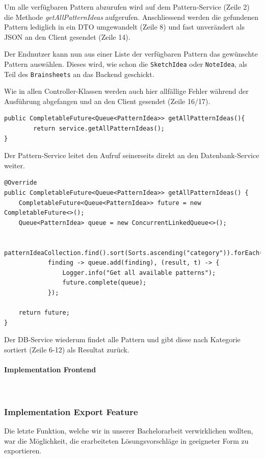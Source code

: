 Um alle verfügbaren Pattern abzurufen wird auf dem Pattern-Service (Zeile 2) die Methode \textit{getAllPatternIdeas} aufgerufen. Anschliessend werden die gefundenen Pattern lediglich in ein DTO umgewandelt (Zeile 8) und fast unverändert als JSON an den Client gesendet (Zeile 14).

Der Endnutzer kann nun aus einer Liste der verfügbaren Pattern das gewünschte Pattern auswählen. Dieses wird, wie schon die \texttt{SketchIdea} oder \texttt{NoteIdea}, als Teil des \texttt{Brainsheets} an das Backend geschickt. 

Wie in allen Controller-Klassen werden auch hier allfällige Fehler während der Ausführung abgefangen und an den Client gesendet (Zeile 16/17).

\begin{lstlisting}[caption={Alle Pattern holen im Pattern Service}, label=getAllPatternInService]
public CompletableFuture<Queue<PatternIdea>> getAllPatternIdeas(){
        return service.getAllPatternIdeas();
}
\end{lstlisting}

Der Pattern-Service leitet den Aufruf seinerseits direkt an den Datenbank-Service weiter.

\begin{lstlisting}[caption={Alle Pattern holen im Pattern DB Service}, label=getAllPatternInDBService]
@Override
public CompletableFuture<Queue<PatternIdea>> getAllPatternIdeas() {
    CompletableFuture<Queue<PatternIdea>> future = new CompletableFuture<>();
    Queue<PatternIdea> queue = new ConcurrentLinkedQueue<>();

    patternIdeaCollection.find().sort(Sorts.ascending("category")).forEach(
            finding -> queue.add(finding), (result, t) -> {
                Logger.info("Get all available patterns");
                future.complete(queue);
            });

    return future;
}
\end{lstlisting}

Der DB-Service wiederum findet alle Pattern und gibt diese nach Kategorie sortiert (Zeile 6-12) als Resultat zurück.

\paragraph*{Implementation Frontend}~\\

\subsubsection{Implementation Export Feature}
Die letzte Funktion, welche wir in unserer Bachelorarbeit verwirklichen wollten, war die Möglichkeit, die erarbeiteten Lösungsvorschläge in geeigneter Form zu exportieren.

